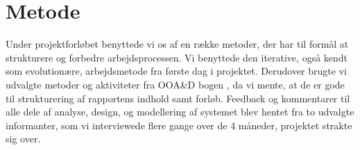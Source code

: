 \chapter{Metode}
\label{chap:metode}
Under projektforløbet benyttede vi os af en række metoder, der har til formål at strukturere og forbedre arbejdsprocessen. Vi benyttede den iterative, også kendt som evolutionære, arbejdsmetode fra første dag i projektet. Derudover brugte vi udvalgte metoder og aktiviteter fra OOA\&D bogen \cite{ooad}, da vi mente, at de er gode til strukturering af rapportens indhold samt forløb. Feedback og kommentarer til alle dele af analyse, design, og modellering af systemet blev hentet fra to udvalgte informanter, som vi interviewede flere gange over de 4 måneder, projektet strakte sig over.





